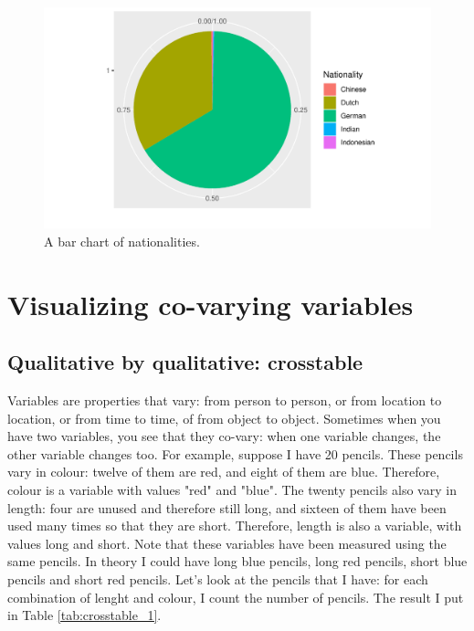 \documentclass[]{report}\usepackage[]{graphicx}\usepackage[]{color}
\makeatletter
\def\maxwidth{ %
  \ifdim\Gin@nat@width>\linewidth
    \linewidth
  \else
    \Gin@nat@width
  \fi
}
\newenvironment{knitrout}{}{} %
\makeatother
\begin{document}
\begin{knitrout}
\color{fgcolor}\begin{figure}

{\centering \includegraphics[width=\maxwidth]{figure/nationality_3-1} 

}

\caption[A bar chart of nationalities]{A bar chart of nationalities.}\label{fig:nationality_3}
\end{figure}


\end{knitrout}






\section{Visualizing co-varying variables}

\subsection{Qualitative by qualitative: crosstable}

Variables are properties that vary: from person to person, or from location to location, or from time to time, of from object to object. Sometimes when you have two variables, you see that they co-vary: when one variable changes, the other variable changes too. For example, suppose I have 20 pencils. These pencils vary in colour: twelve of them are red, and eight of them are blue. Therefore, colour is a variable with values "red" and "blue". The twenty pencils also vary in length: four are unused and therefore still long, and sixteen of them have been used many times so that they are short. Therefore, length is also a variable, with values long and short. Note that these variables have been measured using the same pencils. In theory I could have long blue pencils, long red pencils, short blue pencils and short red pencils. Let's look at the pencils that I have: for each combination of lenght and colour, I count the number of pencils. The result I put in Table \ref{tab:crosstable_1}.
\end{document}
